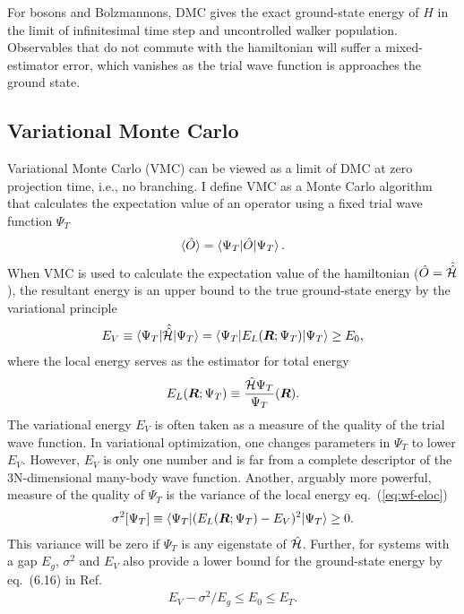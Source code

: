 For bosons and Bolzmannons, DMC gives the exact ground-state energy of $H$ in the limit of infinitesimal time step and uncontrolled walker population. Observables that do not commute with the hamiltonian will suffer a mixed-estimator error, which vanishes as the trial wave function is approaches the ground state.

\subsection{Variational Monte Carlo}
Variational Monte Carlo (VMC) can be viewed as a limit of DMC at zero projection time, i.e., no branching. I define VMC as a Monte Carlo algorithm that calculates the expectation value of an operator using a fixed trial wave function $\Psi_T$
\begin{align} \label{eq:vmc}
\braket{\hat{O}} = \braket{\Psi_T|\hat{O}|\Psi_T}.
\end{align}
When VMC is used to calculate the expectation value of the hamiltonian ($\hat{O}=\hat{\hat{\mathcal{H}}}$), the resultant energy is an upper bound to the true ground-state energy by the variational principle
\begin{align} \label{eq:wf-variational}
E_V\equiv \braket{\Psi_T|\hat{\hat{\mathcal{H}}}|\Psi_T} = \braket{\Psi_T|E_L(\boldsymbol{R};\Psi_T)|\Psi_T} \ge E_0,
\end{align}
where the local energy serves as the estimator for total energy
\begin{align} \label{eq:wf-eloc}
E_L(\boldsymbol{R};\Psi_T) \equiv \dfrac{\hat{\mathcal{H}}\Psi_T}{\Psi_T} (\boldsymbol{R}).
\end{align}
The variational energy $E_V$ is often taken as a measure of the quality of the trial wave function.
In variational optimization, one changes parameters in $\Psi_T$ to lower $E_V$.
However, $E_V$ is only one number and is far from a complete descriptor of the 3N-dimensional many-body wave function.
Another, arguably more powerful, measure of the quality of $\Psi_T$ is the variance of the local energy eq.~(\ref{eq:wf-eloc})
\begin{align}
\sigma^2[\Psi_T] \equiv \braket{\Psi_T|(E_L(\boldsymbol{R};\Psi_T)-E_V)^2|\Psi_T}\ge 0.
\end{align}
This variance will be zero if $\Psi_T$ is any eigenstate of $\hat{\mathcal{H}}$. Further, for systems with a gap $E_g$, $\sigma^2$ and $E_V$ also provide a lower bound for the ground-state energy by eq.~(6.16) in Ref.~\cite{Martin2016}
\begin{align}
E_V-\sigma^2/E_g \le E_0 \le E_T.
\end{align}

